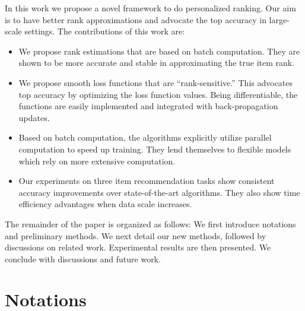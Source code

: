 \documentclass[letterpaper]{article} %
\begin{document}
In this work we propose a novel framework to do personalized ranking. Our aim is to have better rank approximations and advocate the top accuracy in large-scale settings. The contributions of this work are:

\begin{itemize}
\item We propose rank estimations that are based on batch computation. They are shown to be more accurate and stable in approximating the true item rank.
\item We propose smooth loss functions that are ``rank-sensitive.'' This advocates top accuracy by optimizing the loss function values. Being differentiable, the functions are easily implemented and integrated with back-propagation updates.
\item Based on batch computation, the algorithms explicitly utilize parallel computation to speed up training. They lend themselves to flexible models which rely on more extensive computation.
\item Our experiments on three item recommendation tasks show consistent accuracy improvements over state-of-the-art algorithms. They also show time efficiency advantages when data scale increases.
\end{itemize}

The remainder of the paper is organized as follows: We first introduce notations and preliminary methods. We next detail our new methods, followed by discussions on related work. Experimental results are then presented. We conclude with discussions and future work.

\section{Notations}
\label{sec:notation}
\end{document}
